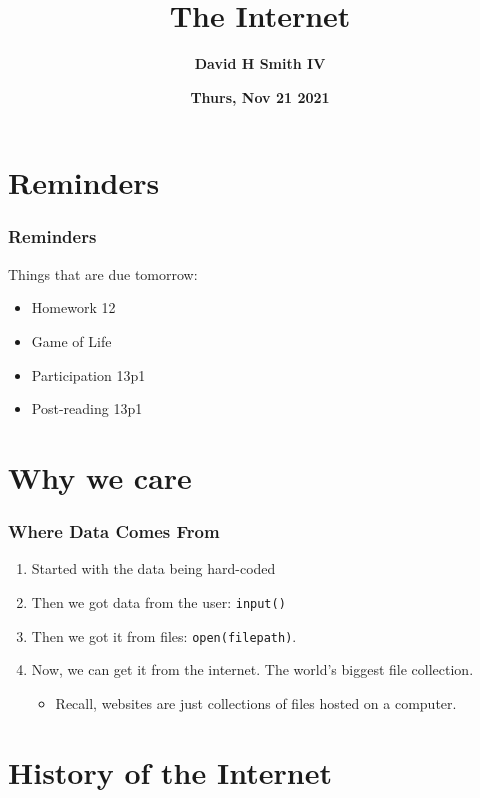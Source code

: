 \documentclass{beamer}
\title{\textbf{The Internet}}
\author{\textbf{David H Smith IV}}
\institute[\textbf{UIUC}]{\textbf{University of Illinois Urbana-Champaign}}
\date{\textbf{Thurs, Nov 21 2021}}
\begin{document}
\frame{\titlepage}

\section{Reminders}

%
%
\begin{frame}
    \frametitle{Reminders}
    Things that are due tomorrow:
    \begin{itemize}
        \item Homework 12 
        \item Game of Life 
        \item Participation 13p1
        \item Post-reading 13p1
    \end{itemize}
\end{frame}

\section{Why we care}
%
%
\begin{frame}[fragile]
    \frametitle{Where Data Comes From}
    \begin{enumerate}
        \item Started with the data being hard-coded
        \item Then we got data from the user: \lstinline|input()|
            \pause
        \item Then we got it from files: \lstinline|open(filepath)|.
            \pause
        \item Now, we can get it from the internet. The world's biggest file collection.
            \begin{itemize}
                \item Recall, websites are just collections of files hosted on a computer.
            \end{itemize}
    \end{enumerate}
\end{frame}

\section{History of the Internet}
\end{document}
